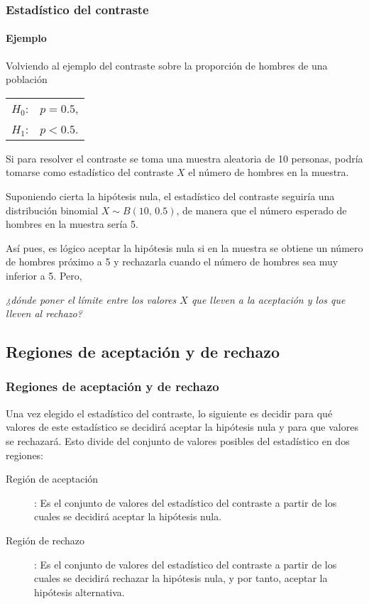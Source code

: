 \begin{frame}
\frametitle{Estadístico del contraste}
\framesubtitle{Ejemplo}
Volviendo al ejemplo del contraste sobre la proporción de hombres de una población
\begin{center}
\begin{tabular}{ll}
$H_0$: & $p=0.5$,\\
$H_1$: & $p<0.5$.
\end{tabular}
\end{center}
Si para resolver el contraste se toma una muestra aleatoria de 10 personas, podría tomarse como estadístico del contraste $X$ el número de hombres en la muestra.

Suponiendo cierta la hipótesis nula, el estadístico del contraste seguiría una distribución binomial $X\sim B(10,\,0.5)$, de manera que el número esperado de hombres en la muestra sería 5.

Así pues, es lógico aceptar la hipótesis nula si en la muestra se obtiene un número de hombres próximo a 5 y rechazarla cuando el número de hombres sea muy inferior a 5. Pero,
\begin{center}
\emph{¿dónde poner el límite entre los valores $X$ que lleven a la aceptación y los que lleven al rechazo?}
\end{center}
\end{frame}


\subsection{Regiones de aceptación y de rechazo}
\begin{frame}
\frametitle{Regiones de aceptación y de rechazo}
Una vez elegido el estadístico del contraste, lo siguiente es decidir para qué valores de este estadístico se decidirá aceptar la hipótesis nula y para que valores se rechazará.
Esto divide del conjunto de valores posibles del estadístico en dos regiones:
\begin{description}
\item[Región de aceptación]: Es el conjunto de valores del estadístico del contraste a partir de los cuales se decidirá aceptar la hipótesis nula.
\item[Región de rechazo]: Es el conjunto de valores del estadístico del contraste a partir de los cuales se decidirá rechazar la hipótesis nula, y por tanto, aceptar la hipótesis alternativa.
\end{description}
\end{frame}


